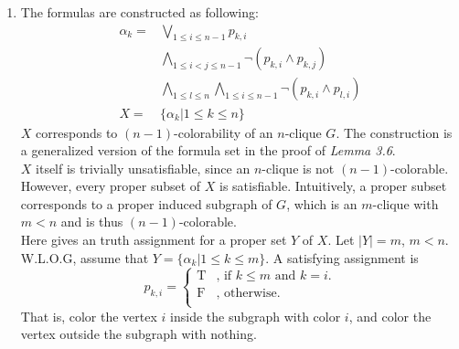 \documentclass[12pt,a4paper]{report}
\theoremstyle{definition}
\theoremstyle{definition}
\begin{document}
\begin{enumerate}[label=(\arabic*)]
\begin{enumerate}[label=(\alph*)]
\[\begin{array}{C|C|C|C}
            \hline
            T & T & T & T\\
            T & F & T & T\\
            F & T & T & T\\
            F & F & F & T
            \end{array}
            \]
        \item
            \[
            \begin{array}{C|C|C|C}
            $p$ & $q$ & $\neg p\to q$ & $p\to(\neg p\to q)$\\
            \hline
            T & T & T & T\\
            T & F & T & T\\
            F & T & T & T\\
            F & F & F & T
            \end{array}
            \]
    \end{enumerate}
    All formulas are tautology.
\item
    The formulas are constructed as following:
    \begin{align*}
    \alpha_k = &\bigvee\limits_{1\leq i\leq n-1}p_{k,i}\\
               &\bigwedge\limits_{1\leq i<j\leq n-1}\neg(p_{k,i}\land p_{k,j})\\
               &\bigwedge\limits_{1\leq l\leq n}\bigwedge\limits_{1\leq i\leq n-1}\neg(p_{k,i}\land p_{l,i})\\
            X=&\{\alpha_k|1\leq k\leq n\}
    \end{align*}
    $X$ corresponds to $(n-1)$-colorability of an $n$-clique $G$. The construction is a generalized version of the formula set in the proof of \textit{Lemma 3.6}. \\
    $X$ itself is trivially unsatisfiable, since an $n$-clique is not $(n-1)$-colorable. However, every proper subset of $X$ is satisfiable. Intuitively, a proper subset corresponds to a proper induced subgraph of $G$, which is an $m$-clique with $m<n$ and is thus $(n-1)$-colorable.\\
    Here gives an truth assignment for a proper set $Y$ of $X$. Let $|Y|=m$, $m<n$. W.L.O.G, assume that $Y=\{\alpha_k|1\leq k\leq m\}$. A satisfying assignment is
        \begin{equation*}
            p_{k,i}=
                \begin{cases}
                \text{T} &\text{, if } k\leq m \text{ and } k=i.\\
                \text{F} &\text{, otherwise.}\\
                \end{cases}
        \end{equation*}
    That is, color the vertex $i$ inside the subgraph with color $i$, and color the vertex outside the subgraph with nothing.


\end{enumerate}
\end{document}
